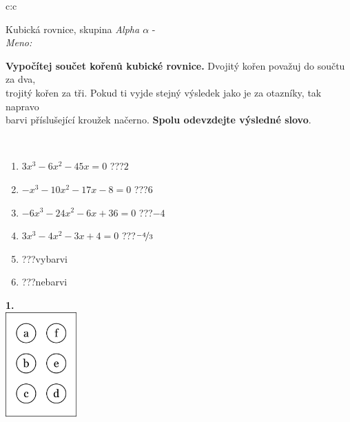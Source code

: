 \documentclass[10pt]{report}
\begin{document}
\thispagestyle{empty}
\begin{tabular}{c:c}
\begin{minipage}[c][104.5mm][t]{0.5\linewidth}
\begin{center}
\vspace{7mm}
{\huge Kubická rovnice, skupina \textit{Alpha $\alpha$} -}\\[5mm]
\textit{Meno:}\phantom{xxxxxxxxxxxxxxxxxxxxxxxxxxxxxxxxxxxxxxxxxxxxxxxxxxxxxxxxxxxxxxxxx}\\[5mm]
\begin{minipage}{0.95\linewidth}
\textbf{Vypočítej součet kořenů kubické rovnice.} Dvojitý kořen považuj do součtu za dva,\\trojitý kořen za tři. Pokud ti vyjde stejný výsledek jako je za otazníky, tak napravo\\barvi příslušející kroužek načerno. \textbf{Spolu odevzdejte výsledné slovo}.
\end{minipage}
\\[1mm]
\begin{minipage}{0.79\linewidth}
\begin{center}
\begin{varwidth}{\linewidth}
\begin{enumerate}
\Large
\item $3x^3-6x^2-45x=0$\quad \dotfill\; ???\;\dotfill \quad $2$
\item $-x^3-10x^2-17x-8=0$\quad \dotfill\; ???\;\dotfill \quad $6$
\item $-6x^3-24x^2-6x+36=0$\quad \dotfill\; ???\;\dotfill \quad $-4$
\item $3x^3-4x^2-3x+4=0$\quad \dotfill\; ???\;\dotfill \quad $\nicefrac{-4}{3}$
\item \quad \dotfill\; ???\;\dotfill \quad vybarvi
\item \quad \dotfill\; ???\;\dotfill \quad nebarvi
\end{enumerate}
\end{varwidth}
\end{center}
\end{minipage}
\begin{minipage}{0.20\linewidth}
\begin{center}
{\Huge\bfseries 1.} \\[2mm]
\includegraphics[height=40mm]{../images/braille.png}

\end{center}
\end{minipage}
\end{center}
\end{minipage}
\end{tabular}
\end{document}
